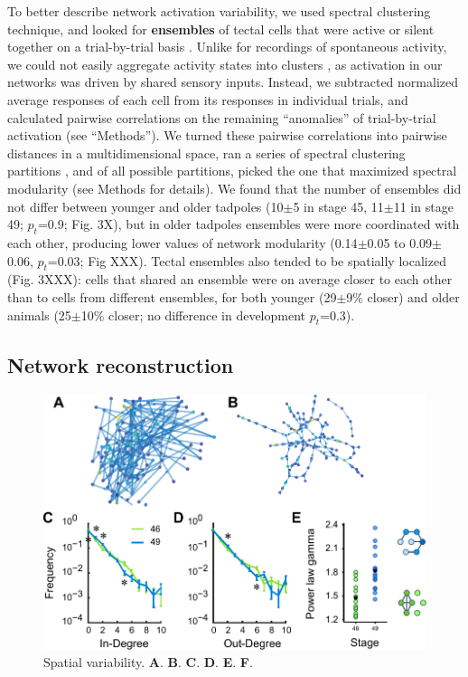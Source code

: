 \documentclass{article}
\begin{document}
To better describe network activation variability, we used spectral clustering technique, and looked for \textbf{ensembles} of tectal cells that were active or silent together on a trial-by-trial basis \citep{thompson2016ensembles}. Unlike for recordings of spontaneous activity, we could not easily aggregate activity states into clusters \citep{avitan2017spontaneous}, as activation in our networks was driven by shared sensory inputs. Instead, we subtracted normalized average responses of each cell from its responses in individual trials, and calculated pairwise correlations on the remaining “anomalies” of trial-by-trial activation (see “Methods”). We turned these pairwise correlations into pairwise distances in a multidimensional space, ran a series of spectral clustering partitions \citep{ng2002spectral}, and of all possible partitions, picked the one that maximized spectral modularity \citep{newman2006modularity,gomez2009community} (see Methods for details). We found that the number of ensembles did not differ between younger and older tadpoles (10$\pm$5 in stage 45, 11$\pm$11 in stage 49; $p_t$=0.9; Fig. 3X), but in older tadpoles ensembles were more coordinated with each other,  producing lower values of network modularity (0.14$\pm$0.05 to 0.09$\pm$0.06, $p_t$=0.03; Fig XXX). Tectal ensembles also tended to be spatially localized (Fig. 3XXX): cells that shared an ensemble were on average closer to each other than to cells from different ensembles, for both younger (29$\pm$9\% closer) and older animals (25$\pm$10\% closer; no difference in development $p_t$=0.3).

\subsection*{Network reconstruction}

\begin{figure}[t]
\includegraphics[width=\linewidth]{fig4.pdf}
\caption{
Spatial variability. \textbf{A}. \textbf{B}. \textbf{C}. \textbf{D}. \textbf{E}. \textbf{F}. }
\end{figure}
\end{document}
